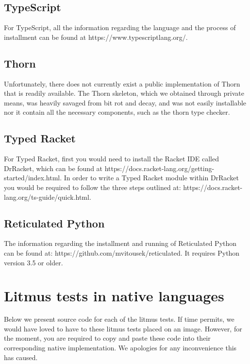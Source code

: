 \documentclass[]{article}
\begin{document}
\subsection{TypeScript}

For TypeScript, all the information regarding the language and the process of installment can be found at https://www.typescriptlang.org/.

\subsection{Thorn}

Unfortunately, there does not currently exist a public implementation of Thorn that is readily available. The Thorn skeleton, which we obtained through private means, was heavily savaged from bit rot and decay, and was not easily installable nor it contain all the necessary components, such as the thorn type checker.

\subsection{Typed Racket}

For Typed Racket, first you would need to install the Racket IDE called DrRacket, which can be found at https://docs.racket-lang.org/getting-started/index.html. In order to write a Typed Racket module within DrRacket you would be required to follow the three steps outlined at: https://docs.racket-lang.org/ts-guide/quick.html.


\subsection{Reticulated Python}

The information regarding the installment and running of Reticulated Python can be found at: https://github.com/mvitousek/reticulated. It requires Python version 3.5 or older. 


\section{Litmus tests in native languages}\label{litmus}

Below we present source code for each of the litmus tests. If time permits, we would have loved to have to these litmus tests placed on an image. However, for the moment, you are required to copy and paste these code into their corresponding native implementation. We apologies for any inconvenience this has caused. 
\end{document}
